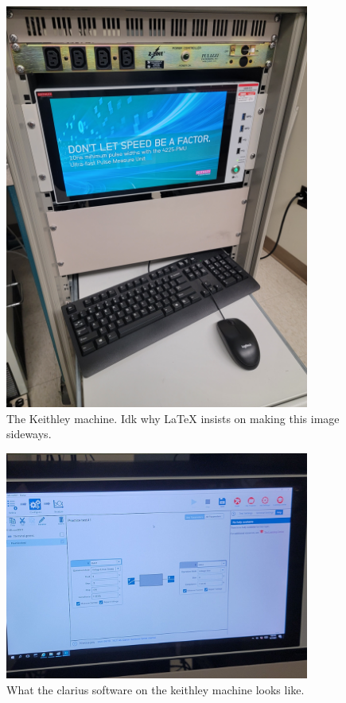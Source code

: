 \documentclass{article}
\begin{document}
          \begin{figure}[H]
            \centering
            \includegraphics[width=10cm]{figures/KeithleyMachine.jpg}
            \caption{The Keithley machine. Idk why \LaTeX\; insists on making this image sideways.}
            \label{keithley}
          \end{figure}
          \begin{figure}[H]
            \centering
            \includegraphics[width=10cm]{figures/clarius_2.jpg}
            \caption{What the clarius software on the keithley machine looks like.}
            \label{clarius2}
          \end{figure}
\end{document}
